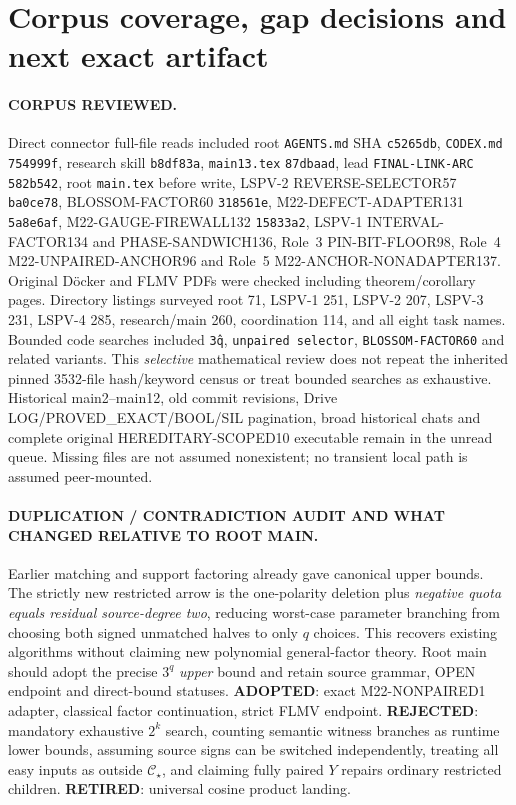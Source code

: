 \documentclass[11pt]{article}
\newcommand{\CS}{\mathcal C_{\star}}
\begin{document}
\section{Corpus coverage, gap decisions and next exact artifact}
\paragraph{CORPUS REVIEWED.}
Direct connector full-file reads included root \texttt{AGENTS.md} SHA \texttt{c5265db}, \texttt{CODEX.md} \texttt{754999f}, research skill \texttt{b8df83a}, \texttt{main13.tex} \texttt{87dbaad}, lead \texttt{FINAL-LINK-ARC} \texttt{582b542}, root \texttt{main.tex} before write, LSPV-2 REVERSE-SELECTOR57 \texttt{ba0ce78}, BLOSSOM-FACTOR60 \texttt{318561e}, M22-DEFECT-ADAPTER131 \texttt{5a8e6af}, M22-GAUGE-FIREWALL132 \texttt{15833a2}, LSPV-1 INTERVAL-FACTOR134 and PHASE-SANDWICH136, Role~3 PIN-BIT-FLOOR98, Role~4 M22-UNPAIRED-ANCHOR96 and Role~5 M22-ANCHOR-NONADAPTER137. Original D\"ocker and FLMV PDFs were checked including theorem/corollary pages. Directory listings surveyed root 71, LSPV-1 251, LSPV-2 207, LSPV-3 231, LSPV-4 285, research/main 260, coordination 114, and all eight task names. Bounded code searches included \texttt{3\^q}, \texttt{unpaired selector}, \texttt{BLOSSOM-FACTOR60} and related variants. This \emph{selective} mathematical review does not repeat the inherited pinned 3532-file hash/keyword census or treat bounded searches as exhaustive. Historical main2--main12, old commit revisions, Drive LOG/PROVED\_EXACT/BOOL/SIL pagination, broad historical chats and complete original HEREDITARY-SCOPED10 executable remain in the unread queue. Missing files are not assumed nonexistent; no transient local path is assumed peer-mounted.

\paragraph{DUPLICATION / CONTRADICTION AUDIT AND WHAT CHANGED RELATIVE TO ROOT MAIN.}
Earlier matching and support factoring already gave canonical upper bounds. The strictly new restricted arrow is the one-polarity deletion plus \emph{negative quota equals residual source-degree two}, reducing worst-case parameter branching from choosing both signed unmatched halves to only $q$ choices. This recovers existing algorithms without claiming new polynomial general-factor theory. Root main should adopt the precise $3^q$ \emph{upper} bound and retain source grammar, OPEN endpoint and direct-bound statuses. \textbf{ADOPTED}: exact M22-NONPAIRED1 adapter, classical factor continuation, strict FLMV endpoint. \textbf{REJECTED}: mandatory exhaustive $2^k$ search, counting semantic witness branches as runtime lower bounds, assuming source signs can be switched independently, treating all easy inputs as outside $\CS$, and claiming fully paired $Y$ repairs ordinary restricted children. \textbf{RETIRED}: universal cosine product landing.
\end{document}
